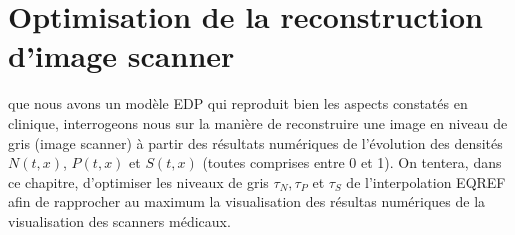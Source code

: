 \documentclass[main.tex]{subfiles}
\begin{document}
\chapter{Optimisation de la reconstruction d'image scanner \label{chap:optim_grey}}
 que nous avons un modèle EDP qui reproduit bien les aspects constatés en clinique, interrogeons nous sur la manière de reconstruire une image en niveau de gris (image scanner) à partir des résultats numériques \ie de l'évolution des densités $N(t,x)$, $P(t,x)$ et $S(t,x)$ (toutes comprises entre 0 et 1). On tentera, dans ce chapitre, d'optimiser les niveaux de gris $\tau_N, \tau_P$ et $\tau_S$ de l'interpolation EQREF  afin de rapprocher au maximum la visualisation des résultas numériques de la visualisation des scanners médicaux.
\end{document}
